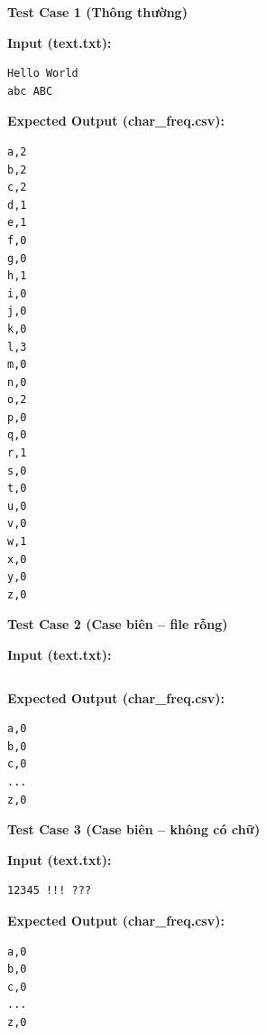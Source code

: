 \textbf{Test Case 1 (Thông thường)}

\textbf{Input (text.txt):}

\begin{lstlisting}
Hello World
abc ABC
\end{lstlisting}

\textbf{Expected Output (char\_freq.csv):}

\begin{lstlisting}
a,2
b,2
c,2
d,1
e,1
f,0
g,0
h,1
i,0
j,0
k,0
l,3
m,0
n,0
o,2
p,0
q,0
r,1
s,0
t,0
u,0
v,0
w,1
x,0
y,0
z,0
\end{lstlisting}

\vspace{0.5cm}

\textbf{Test Case 2 (Case biên -- file rỗng)}

\textbf{Input (text.txt):}

\begin{lstlisting}

\end{lstlisting}

\textbf{Expected Output (char\_freq.csv):}

\begin{lstlisting}
a,0
b,0
c,0
...
z,0
\end{lstlisting}

\vspace{0.5cm}

\textbf{Test Case 3 (Case biên -- không có chữ)}

\textbf{Input (text.txt):}

\begin{lstlisting}
12345 !!! ???
\end{lstlisting}

\textbf{Expected Output (char\_freq.csv):}

\begin{lstlisting}
a,0
b,0
c,0
...
z,0
\end{lstlisting}
